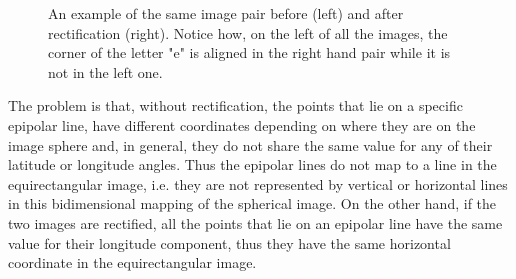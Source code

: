 \begin{figure}
\begin{subfigure}{0.4\linewidth}
	\end{subfigure}
	\caption{An example of the same image pair before (left) and after
	rectification (right). Notice how, on the left of all the images,
	the corner of the letter "e" is aligned
	in the right hand pair while it is not in the left one.}\label{fig:rectified_pair}
\end{figure}

The problem is that, without rectification, the points that lie on a specific
epipolar line, have different coordinates depending on where they are on the
image sphere and, in general, they do not share the same value for any of their 
latitude or longitude angles. Thus the epipolar lines do not map to a line in
the equirectangular image, i.e. they are not represented by vertical or 
horizontal lines in this bidimensional mapping of the spherical image.
On the other hand, if the two images are rectified, all the points that lie
on an epipolar line have the same value for their longitude component, thus
they have the same horizontal coordinate in the equirectangular image.

